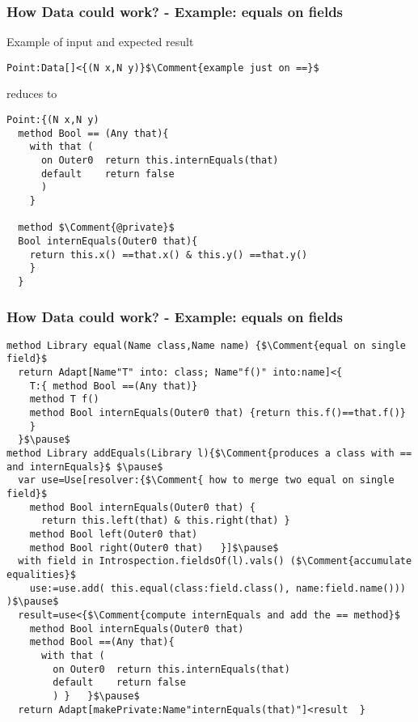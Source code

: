 \begin{frame}[fragile]
\frametitle{How Data could work? - Example: equals on fields}
Example of input and expected result
\begin{NiceCode}{59ex}{0.76}
\begin{lstlisting}
Point:Data[]<{(N x,N y)}$\Comment{example just on ==}$
\end{lstlisting}
\end{NiceCode}
reduces to
\begin{NiceCode}{59ex}{0.76}
\begin{lstlisting}
Point:{(N x,N y)
  method Bool == (Any that){
    with that (
      on Outer0  return this.internEquals(that) 
      default    return false 
      )
    }

  method $\Comment{@private}$
  Bool internEquals(Outer0 that){
    return this.x() ==that.x() & this.y() ==that.y()
    }
  }
\end{lstlisting}
\end{NiceCode}

\end{frame}


\begin{frame}[fragile]
\frametitle{How Data could work? - Example: equals on fields}
\begin{NiceCode}{59ex}{0.76}
\begin{lstlisting}
method Library equal(Name class,Name name) {$\Comment{equal on single field}$
  return Adapt[Name"T" into: class; Name"f()" into:name]<{
    T:{ method Bool ==(Any that)}
    method T f()
    method Bool internEquals(Outer0 that) {return this.f()==that.f()}
    }  
  }$\pause$
method Library addEquals(Library l){$\Comment{produces a class with == and internEquals}$ $\pause$
  var use=Use[resolver:{$\Comment{ how to merge two equal on single field}$
    method Bool internEquals(Outer0 that) {
      return this.left(that) & this.right(that) }
    method Bool left(Outer0 that)
    method Bool right(Outer0 that)   }]$\pause$
  with field in Introspection.fieldsOf(l).vals() ($\Comment{accumulate equalities}$
    use:=use.add( this.equal(class:field.class(), name:field.name()))  )$\pause$
  result=use<{$\Comment{compute internEquals and add the == method}$
    method Bool internEquals(Outer0 that)
    method Bool ==(Any that){
      with that (
        on Outer0  return this.internEquals(that)
        default    return false
        ) }   }$\pause$
  return Adapt[makePrivate:Name"internEquals(that)"]<result  }
\end{lstlisting}
\end{NiceCode}
\end{frame}


